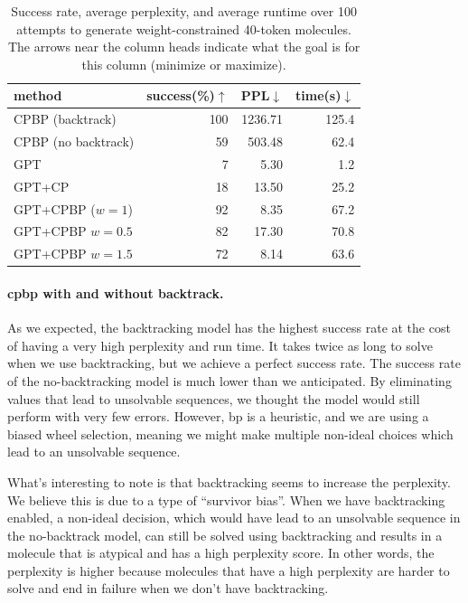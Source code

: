 \documentclass[../Document.tex]{subfiles}
\begin{document}
\begin{table}[t]
    \centering
    \begin{tabular}{l r r r}
        \hline
        method & success(\%)$\uparrow$ & PPL$\downarrow$ & time(s)$\downarrow$\\
        \hline
        CPBP (backtrack)        & 100   & 1236.71   & 125.4 \\
        CPBP (no backtrack)     & 59    & 503.48    & 62.4 \\
        GPT                     & 7     & 5.30      & 1.2 \\
        GPT+CP                  & 18    & 13.50     & 25.2 \\
        GPT+CPBP ($w=1$)        & 92    & 8.35      & 67.2 \\
        GPT+CPBP $w=0.5$        & 82    & 17.30     & 70.8 \\
        GPT+CPBP $w=1.5$        & 72    & 8.14      & 63.6 \\
        \hline
    \end{tabular}
    \caption[Success rate, average perplexity, and average runtime over 100 attempts to generate weight-constrained 40-token molecules.]{Success rate, average perplexity, and average runtime over 100 attempts to generate weight-constrained 40-token molecules. The arrows near the column heads indicate what the goal is for this column (\ie minimize or maximize).}
    \label{tab:molweight}
\end{table}

\paragraph{\gls{cpbp} with and without backtrack.}
As we expected, the backtracking model has the highest success rate at the cost of having a very high perplexity and run time. It takes twice as long to solve when we use backtracking, but we achieve a perfect success rate.
The success rate of the no-backtracking model is much lower than we anticipated. By eliminating values that lead to unsolvable sequences, we thought the model would still perform with very few errors. However, \gls{bp} is a heuristic, and we are using a biased wheel selection, meaning we might make multiple non-ideal choices which lead to an unsolvable sequence.

What's interesting to note is that backtracking seems to increase the perplexity. We believe this is due to a type of ``survivor bias''. When we have backtracking enabled, a non-ideal decision, which would have lead to an unsolvable sequence in the no-backtrack model, can still be solved using backtracking and results in a molecule that is atypical and has a high perplexity score. In other words, the perplexity is higher because molecules that have a high perplexity are harder to solve and end in failure when we don't have backtracking.
\end{document}

